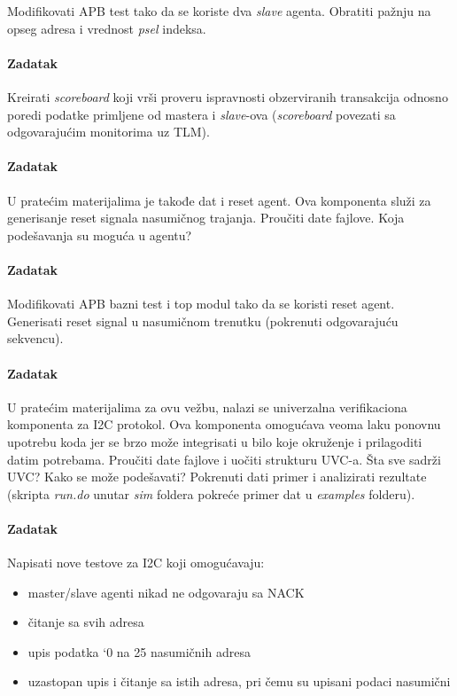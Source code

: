 Modifikovati APB test tako da se koriste dva \emph{slave} agenta. Obratiti
pažnju na opseg adresa i vrednost \emph{psel} indeksa.

\paragraph{Zadatak}

Kreirati \emph{scoreboard} koji vrši proveru ispravnosti obzerviranih
transakcija odnosno poredi podatke primljene od mastera i \emph{slave}-ova
(\emph{scoreboard} povezati sa odgovarajućim monitorima uz TLM).

\paragraph{Zadatak}

U pratećim materijalima je takođe dat i reset agent. Ova komponenta služi za
generisanje reset signala nasumičnog trajanja. Proučiti date fajlove. Koja
podešavanja su moguća u agentu?

\paragraph{Zadatak}

Modifikovati APB bazni test i top modul tako da se koristi reset agent.
Generisati reset signal u nasumičnom trenutku (pokrenuti odgovarajuću sekvencu).

\paragraph{Zadatak}

U pratećim materijalima za ovu vežbu, nalazi se univerzalna verifikaciona
komponenta za I2C protokol. Ova komponenta omogućava veoma laku ponovnu upotrebu
koda jer se brzo može integrisati u bilo koje okruženje i prilagoditi datim
potrebama. Proučiti date fajlove i uočiti strukturu UVC-a. Šta sve sadrži UVC?
Kako se može podešavati? Pokrenuti dati primer i analizirati rezultate (skripta
\emph{run.do} unutar \emph{sim} foldera pokreće primer dat u \emph{examples}
folderu).

\paragraph{Zadatak}

Napisati nove testove za I2C koji omogućavaju:

\begin{itemize}
\item master/slave agenti nikad ne odgovaraju sa NACK
\item čitanje sa svih adresa
\item upis podatka ‘0 na 25 nasumičnih adresa
\item uzastopan upis i čitanje sa istih adresa, pri čemu su upisani podaci
  nasumični
\end{itemize}

